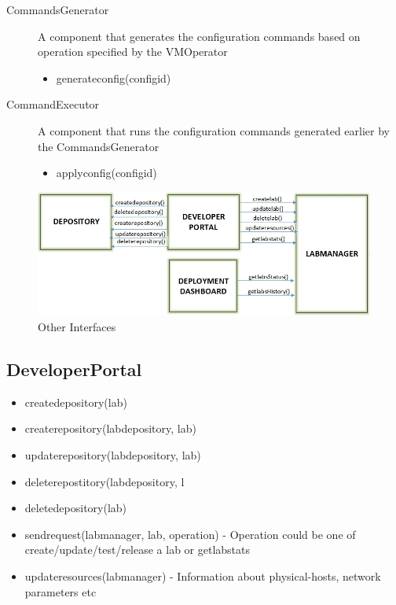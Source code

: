 \documentclass[11pt]{article}
\begin{document}
\begin{description}
\item [CommandsGenerator] A component that generates the
         configuration commands based on operation specified by the
         VMOperator

\begin{itemize}
\item generateconfig(configid)
\end{itemize}

\item [CommandExecutor] A component that runs the configuration
         commands generated earlier by the CommandsGenerator

\begin{itemize}
\item applyconfig(configid)
\end{itemize}

\end{description}
    

   \begin{figure}[H]
\centering
\includegraphics[width=16cm]{Other-Interfaces.jpg}
\caption{Other Interfaces}
\end{figure}   

\subsection{DeveloperPortal}
\label{sec-4.3}


\begin{itemize}
\item createdepository(lab)
\item createrepository(labdepository, lab)
\item updaterepository(labdepository, lab)
\item deleterepostitory(labdepository, l
\item deletedepository(lab)
\item sendrequest(labmanager, lab, operation) - Operation could be one of  create/update/test/release a lab or getlabstats
\item updateresources(labmanager) - Information about physical-hosts, network parameters etc
\end{itemize}
\end{document}
